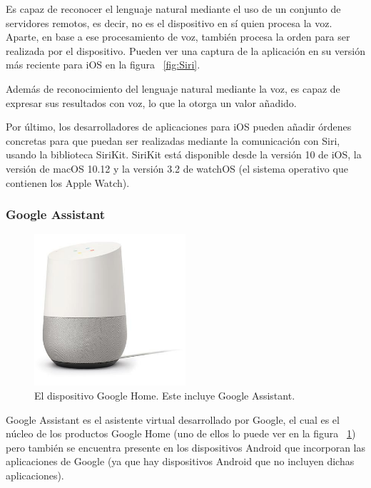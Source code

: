 \documentclass[spanish,12pt, a4paper, twoside]{paper}
\begin{document}
Es capaz de reconocer el lenguaje natural mediante el uso de un conjunto de servidores remotos, es decir, no es el dispositivo en sí quien procesa la voz. Aparte, en base a ese procesamiento de voz, también procesa la orden para ser realizada por el dispositivo. Pueden ver una captura de la aplicación en su versión más reciente para iOS en la figura ~\ref{fig:Siri}.
\newline

Además de reconocimiento del lenguaje natural mediante la voz, es capaz de expresar sus resultados con voz, lo que la otorga un valor añadido.
\newline

Por último, los desarrolladores de aplicaciones para iOS pueden añadir órdenes concretas para que puedan ser realizadas mediante la comunicación con Siri, usando la biblioteca SiriKit. SiriKit está disponible desde la versión 10 de iOS, la versión de macOS 10.12 y la versión 3.2 de watchOS (el sistema operativo que contienen los Apple Watch).

\subsubsection{Google Assistant}

\begin{figure}[h]
\centering
	\includegraphics[width=0.5\textwidth]{recursos/homeG}
\caption{El dispositivo Google Home. Este incluye Google Assistant.}
\label{fig:Dispositivo Google Home}
\end{figure}

Google Assistant es el asistente virtual desarrollado por Google, el cual es el núcleo de los productos Google Home (uno de ellos lo puede ver en la figura ~\ref{fig:Dispositivo Google Home}) pero también se encuentra presente en los dispositivos Android que incorporan las aplicaciones de Google (ya que hay dispositivos Android que no incluyen dichas aplicaciones).
\newline
\end{document}
